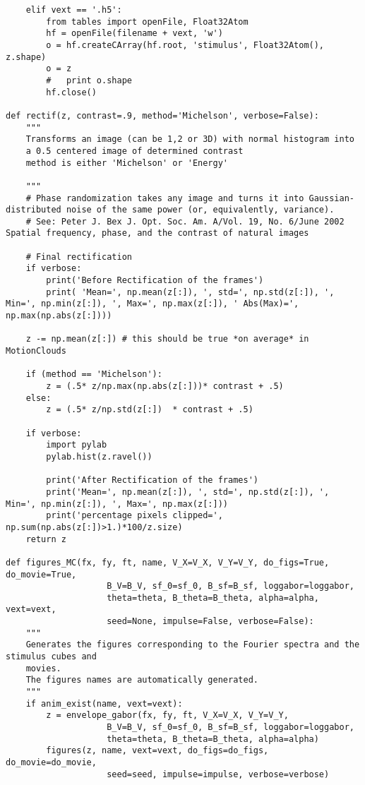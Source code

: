 \documentclass[a4paper,11pt]{article}%
\begin{document}
\begin{lstlisting}
    elif vext == '.h5':
        from tables import openFile, Float32Atom
        hf = openFile(filename + vext, 'w')
        o = hf.createCArray(hf.root, 'stimulus', Float32Atom(), z.shape)
        o = z
        #   print o.shape
        hf.close()

def rectif(z, contrast=.9, method='Michelson', verbose=False):
    """ 
    Transforms an image (can be 1,2 or 3D) with normal histogram into
    a 0.5 centered image of determined contrast
    method is either 'Michelson' or 'Energy'

    """
    # Phase randomization takes any image and turns it into Gaussian-distributed noise of the same power (or, equivalently, variance).
    # See: Peter J. Bex J. Opt. Soc. Am. A/Vol. 19, No. 6/June 2002 Spatial frequency, phase, and the contrast of natural images

    # Final rectification
    if verbose:
        print('Before Rectification of the frames')
        print( 'Mean=', np.mean(z[:]), ', std=', np.std(z[:]), ', Min=', np.min(z[:]), ', Max=', np.max(z[:]), ' Abs(Max)=', np.max(np.abs(z[:])))

    z -= np.mean(z[:]) # this should be true *on average* in MotionClouds

    if (method == 'Michelson'):
        z = (.5* z/np.max(np.abs(z[:]))* contrast + .5)
    else:
        z = (.5* z/np.std(z[:])  * contrast + .5)

    if verbose:
        import pylab
        pylab.hist(z.ravel())

        print('After Rectification of the frames')
        print('Mean=', np.mean(z[:]), ', std=', np.std(z[:]), ', Min=', np.min(z[:]), ', Max=', np.max(z[:]))
        print('percentage pixels clipped=', np.sum(np.abs(z[:])>1.)*100/z.size)
    return z

def figures_MC(fx, fy, ft, name, V_X=V_X, V_Y=V_Y, do_figs=True, do_movie=True,
                    B_V=B_V, sf_0=sf_0, B_sf=B_sf, loggabor=loggabor,
                    theta=theta, B_theta=B_theta, alpha=alpha, vext=vext,
                    seed=None, impulse=False, verbose=False):
    """
    Generates the figures corresponding to the Fourier spectra and the stimulus cubes and
    movies.
    The figures names are automatically generated.
    """
    if anim_exist(name, vext=vext):
        z = envelope_gabor(fx, fy, ft, V_X=V_X, V_Y=V_Y,
                    B_V=B_V, sf_0=sf_0, B_sf=B_sf, loggabor=loggabor,
                    theta=theta, B_theta=B_theta, alpha=alpha)
        figures(z, name, vext=vext, do_figs=do_figs, do_movie=do_movie,
                    seed=seed, impulse=impulse, verbose=verbose)


\end{lstlisting}
\end{document}
